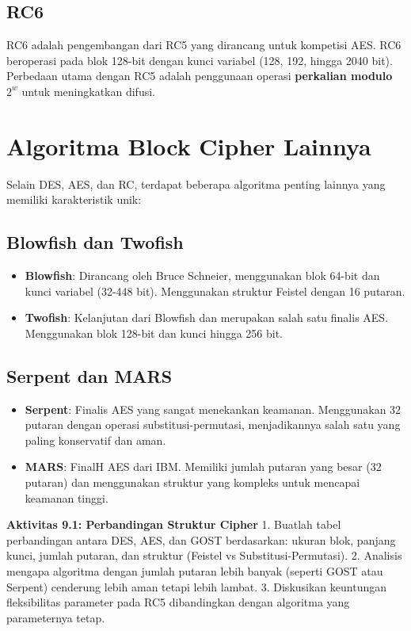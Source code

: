 \documentclass[../main.tex]{subfiles}
\begin{document}
\subsection{RC6}
RC6 adalah pengembangan dari RC5 yang dirancang untuk kompetisi AES. RC6 beroperasi pada blok 128-bit dengan kunci variabel (128, 192, hingga 2040 bit). Perbedaan utama dengan RC5 adalah penggunaan operasi \textbf{perkalian modulo $2^w$} untuk meningkatkan difusi.

\section{Algoritma Block Cipher Lainnya}
Selain DES, AES, dan RC, terdapat beberapa algoritma penting lainnya yang memiliki karakteristik unik:

\subsection{Blowfish dan Twofish}
\begin{itemize}
    \item \textbf{Blowfish}: Dirancang oleh Bruce Schneier, menggunakan blok 64-bit dan kunci variabel (32-448 bit). Menggunakan struktur Feistel dengan 16 putaran.
    \item \textbf{Twofish}: Kelanjutan dari Blowfish dan merupakan salah satu finalis AES. Menggunakan blok 128-bit dan kunci hingga 256 bit.
\end{itemize}

\subsection{Serpent dan MARS}
\begin{itemize}
    \item \textbf{Serpent}: Finalis AES yang sangat menekankan keamanan. Menggunakan 32 putaran dengan operasi substitusi-permutasi, menjadikannya salah satu yang paling konservatif dan aman.
    \item \textbf{MARS}: FinalH AES dari IBM. Memiliki jumlah putaran yang besar (32 putaran) dan menggunakan struktur yang kompleks untuk mencapai keamanan tinggi.
\end{itemize}

\begin{obeactivity}
\textbf{Aktivitas 9.1: Perbandingan Struktur Cipher}
1. Buatlah tabel perbandingan antara DES, AES, dan GOST berdasarkan: ukuran blok, panjang kunci, jumlah putaran, dan struktur (Feistel vs Substitusi-Permutasi).
2. Analisis mengapa algoritma dengan jumlah putaran lebih banyak (seperti GOST atau Serpent) cenderung lebih aman tetapi lebih lambat.
3. Diskusikan keuntungan fleksibilitas parameter pada RC5 dibandingkan dengan algoritma yang parameternya tetap.
\end{obeactivity}
\end{document}
